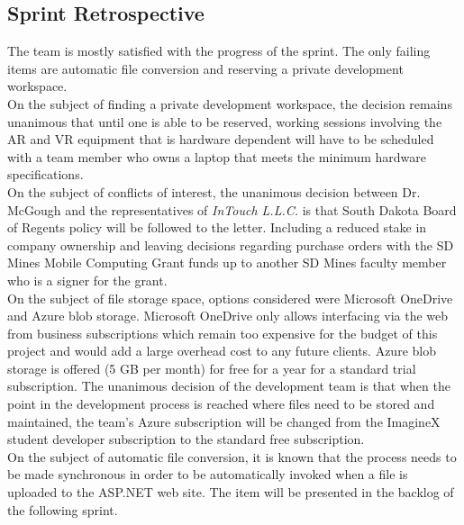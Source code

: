     \subsection{Sprint Retrospective}
    \label{sec:Sprint3_retrospective}
        \hspace{7mm}
        The team is mostly satisfied with the progress of the sprint.  The only failing items are automatic file
        conversion and reserving a private development workspace.\\

        On the subject of finding a private development workspace, the decision remains unanimous that until one 
        is able to be reserved, working sessions involving the AR and VR equipment that is hardware dependent 
        will have to be scheduled with a team member who owns a laptop that meets the minimum hardware
        specifications.\\

        On the subject of conflicts of interest, the unanimous decision between Dr. McGough and the representatives
        of \textit{InTouch L.L.C.} is that South Dakota Board of Regents policy will be followed to the letter.
        Including a reduced stake in company ownership and leaving decisions regarding purchase orders with the SD 
        Mines Mobile Computing Grant funds up to another SD Mines faculty member who is a signer for the grant.\\
        
        On the subject of file storage space, options considered were Microsoft OneDrive and Azure blob storage.
        Microsoft OneDrive only allows interfacing via the web from business subscriptions which remain too 
        expensive for the budget of this project and would add a large overhead cost to any future clients.
        Azure blob storage is offered (5 GB per month) for free for a year for a standard trial subscription.
        The unanimous decision of the development team is that when the point in the development process is reached
        where files need to be stored and maintained, the team's Azure subscription will be changed from the 
        ImagineX student developer subscription to the standard free subscription.\\
        
        On the subject of automatic file conversion, it is known that the process needs to be made synchronous
        in order to be automatically invoked when a file is uploaded to the ASP.NET web site.  The item will be
        presented in the backlog of the following sprint.
